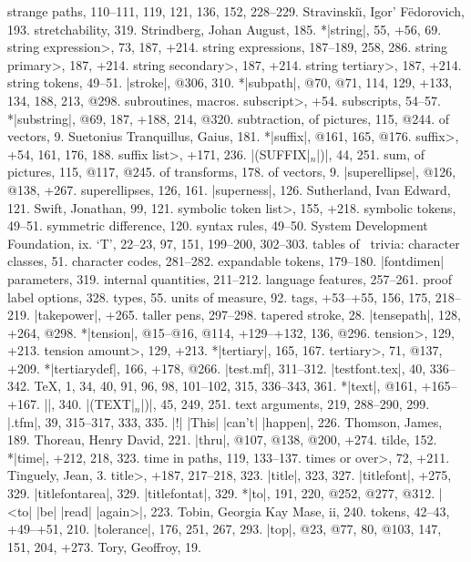 strange paths, 110--111, 119, 121, 136, 152, 228--229.
Stravinski{\u\i}, Igor' F\"edorovich, 193.
stretchability, 319.
Strindberg, Johan August, 185.
*|string|, 55, +56, 69.
\<string expression>, 73, 187, +214.
string expressions, 187--189, 258, 286.
\<string primary>, 187, +214.
\<string secondary>, 187, +214.
\<string tertiary>, 187, +214.
string tokens, 49--51.
|stroke|, @306, 310.
*|subpath|, @70, @71, 114, 129, +133, 134, 188, 213, @298.
subroutines, \see macros.
\<subscript>, +54.
subscripts, 54--57.
*|substring|, @69, 187, +188, 214, @320.
subtraction, of pictures, 115, @244.
\sub of vectors, 9.
Suetonius Tranquillus, Gaius, 181.
*|suffix|, @161, 165, @176.
\<suffix>, +54, 161, 176, 188.
\<suffix list>, +171, 236.
|(SUFFIX|$_n$|)|, 44, 251.
sum, of pictures, 115, @117, @245.
\sub of transforms, 178.
\sub of vectors, 9.
|superellipse|, @126, @138, +267.
superellipses, 126, 161.
|superness|, 126.
Sutherland, Ivan Edward, 121.
Swift, Jonathan, 99, 121.
\<symbolic token list>, 155, +218.
symbolic tokens, 49--51.
symmetric difference, 120.
syntax rules, 49--50.
System Development Foundation, ix.
\newletter
`T', 22--23, 97, 151, 199--200, 302--303.
tables of \MF\ trivia:
\sub character classes, 51.
\sub character codes, 281--282.
\sub expandable tokens, 179--180.
\sub |fontdimen| parameters, 319.
\sub internal quantities, 211--212.
\sub language features, 257--261.
\sub proof\/ label options, 328.
\sub types, 55.
\sub units of measure, 92.
tags, +53--+55, 156, 175, 218--219.
|takepower|, +265.
taller pens, 297--298.
tapered stroke, 28.
|tensepath|, 128, +264, @298.
*|tension|, @15--@16, @114, +129--+132, 136, @296.
\<tension>, 129, +213.
\<tension amount>, 129, +213.
*|tertiary|, 165, 167.
\<tertiary>, 71, @137, +209.
*|tertiarydef|, 166, +178, @266.
|test.mf|, 311--312.
|testfont.tex|, 40, 336--342.
\TeX, 1, 34, 40, 91, 96, 98, 101--102, 315, 336--343, 361.
*|text|, @161, +165--+167.
|\text|, 340.
|(TEXT|$_n$|)|, 45, 249, 251.
text arguments, 219, 288--290, 299.
|.tfm|, 39, 315--317, 333, 335.
|!| |This| |can't| |happen|, 226.
Thomson, James, 189.
Thoreau, Henry David, 221.
|thru|, @107, @138, @200, +274.
tilde, 152.
*|time|, +212, 218, 323.
time in paths, 119, 133--137.
\<times or over>, 72, +211.
Tinguely, Jean, 3.
\<title>, +187, 217--218, 323.
|title|, 323, 327.
|titlefont|, +275, 329.
|titlefontarea|, 329.
|titlefontat|, 329.
*|to|, 191, 220, @252, @277, @312.
|<to| |be| |read| |again>|, 223.
Tobin, Georgia Kay Mase, ii, 240.
tokens, 42--43, +49--+51, 210.
|tolerance|, 176, 251, 267, 293.
|top|, @23, @77, 80, @103, 147, 151, 204, +273.
Tory, Geoffroy, 19.
